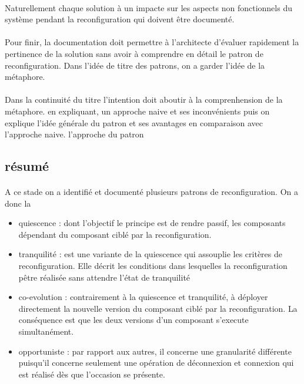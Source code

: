 \paragraph{}
Naturellement chaque solution à un impacte sur les aspects non
fonctionnels du système pendant la reconfiguration qui doivent être
documenté. 

\paragraph{}
Pour finir, la documentation doit permettre à l'architecte d'évaluer
rapidement la pertinence de la solution sans avoir à comprendre en
détail le patron de reconfiguration. Dans l'idée de titre des patrons, on a garder l'idée de la métaphore.

\paragraph{}
Dans la continuité du titre l'intention doit aboutir à la
comprenhension de la métaphore. en expliquant, un approche naive et
ses inconvénients puis on explique l'idée générale du patron et ses
avantages en comparaison avec l'approche naive. 
l'approche du patron  

\subsection{résumé } 

\paragraph{}
A ce stade on a identifié et documenté plusieurs patrons de
reconfiguration. On a donc la 

\begin{itemize}
\item quiescence : dont l'objectif le principe est de rendre passif,
les composants dépendant du composant ciblé par la reconfiguration. 
\item tranquilité : est une variante de la quiescence qui assouplie
les critères de reconfiguration. Elle décrit les conditions dans
lesquelles la reconfiguration pêtre réalisée sans attendre l'état de
tranquilité
\item co-evolution : contrairement à la quiescence et tranquilité, à
déployer directement la nouvelle version du composant ciblé par la
reconfiguration. La conséquence est que les deux versions d'un
composant s'execute simultanément. 
\item opportuniste : par rapport aux autres, il concerne une
granularité différente puisqu'il concerne seulement une opération de
déconnexion et connexion qui est réalisé dès que l'occasion se
présente.  
\end{itemize}




